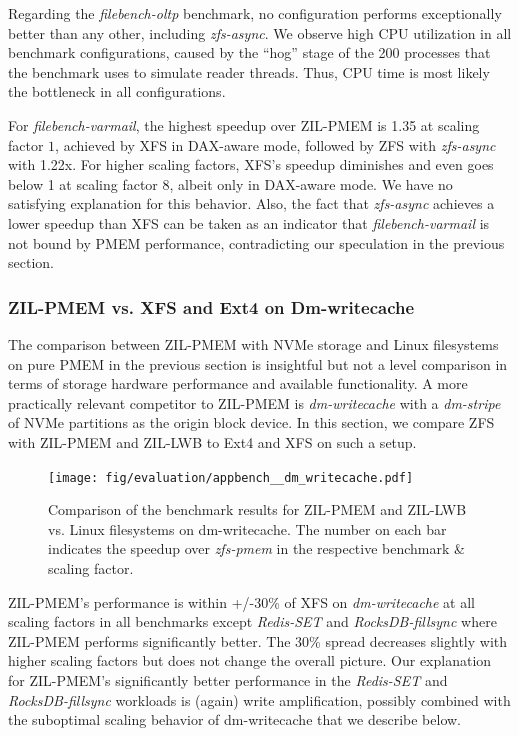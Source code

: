 \documentclass[12pt,a4paper,twoside]{book}
\begin{document}
Regarding the \textit{filebench-oltp} benchmark, no configuration performs exceptionally better than any other, including \textit{zfs-async}.
We observe high CPU utilization in all benchmark configurations, caused by the ``hog'' stage of the 200 processes that the benchmark uses to simulate reader threads.
Thus, CPU time is most likely the bottleneck in all configurations.

For \textit{filebench-varmail}, the highest speedup over ZIL-PMEM is 1.35 at scaling factor $1$, achieved by XFS in DAX-aware mode, followed by ZFS with \textit{zfs-async} with 1.22x.
For higher scaling factors, XFS's speedup diminishes and even goes below 1 at scaling factor $8$, albeit only in DAX-aware mode.
We have no satisfying explanation for this behavior.
Also, the fact that \textit{zfs-async} achieves a lower speedup than XFS can be taken as an indicator that \textit{filebench-varmail} is not bound by PMEM performance, contradicting our speculation in the previous section.

\subsubsection{ZIL-PMEM vs. XFS and Ext4 on Dm-writecache}\label{sec:eval:dmwritecache}

The comparison between ZIL-PMEM with NVMe storage and Linux filesystems on pure PMEM in the previous section is insightful but not a level comparison in terms of storage hardware performance and available functionality.
A more practically relevant competitor to ZIL-PMEM is \textit{dm-writecache} with a \textit{dm-stripe} of NVMe partitions as the origin block device.
In this section, we compare ZFS with ZIL-PMEM and ZIL-LWB to Ext4 and XFS on such a setup.

\begin{figure}[H]
    \centering
    \texttt{[image: fig/evaluation/appbench\_\_dm\_writecache.pdf]}
    \caption{
        Comparison of the benchmark results for ZIL-PMEM and ZIL-LWB vs. Linux filesystems on dm-writecache.
        The number on each bar indicates the speedup over \textit{zfs-pmem} in the respective benchmark \& scaling factor.
    }
\end{figure}

ZIL-PMEM's performance is within +/-30\% of XFS on \textit{dm-writecache} at all scaling factors in all benchmarks except \textit{Redis-SET} and \textit{RocksDB-fillsync} where ZIL-PMEM performs significantly better.
The 30\% spread decreases slightly with higher scaling factors but does not change the overall picture.
Our explanation for ZIL-PMEM's significantly better performance in the \textit{Redis-SET} and \textit{RocksDB-fillsync} workloads is (again) write amplification, possibly combined with the suboptimal scaling behavior of dm-writecache that we describe below.
\end{document}
